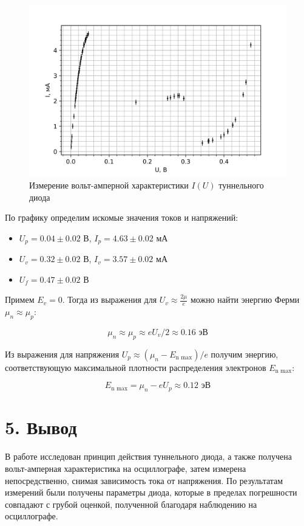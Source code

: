 \documentclass[a4paper,12pt]{report}
\begin{document}
\begin{figure}[H]
    \includegraphics[scale=0.8]{I(U).png}
    \caption{Измерение вольт-амперной характеристики $I(U)$ туннельного диода}
    \label{graf}
\end{figure}

По графику определим искомые значения токов и напряжений:
	
\begin{itemize}
    \centering
    \item $ U_p = 0.04 \pm 0.02 $ В, $ I_p = 4.63 \pm 0.02 $ мА
    \item $ U_v = 0.32 \pm 0.02 $ В, $ I_v = 3.57 \pm 0.02 $ мА
    \item $ U_f = 0.47 \pm 0.02 $ В
\end{itemize} 

Примем $E_v = 0$. Тогда из выражения для $U_v \approx \frac{2\mu}{e}$ можно найти энергию Ферми $\mu_n \approx \mu_p$:

\[ \mu_n \approx \mu_p \approx eU_v/2 \approx 0.16 \text{ эВ} \]

Из выражения для напряжения $U_p \approx (\mu_n - E_\text{n max})/e$ получим энергию, соответствующую максимальной плотности распределения электронов $E_\text{n max}$:

\[ E_\text{n max} = \mu_n - eU_p \approx 0.12 \text{ эВ} \] 

\section*{5. Вывод}

В работе исследован принцип действия туннельного диода, а также получена вольт-амперная характеристика на осциллографе, затем измерена непосредственно, снимая зависимость тока от напряжения. По результатам измерений были получены параметры диода, которые в пределах погрешности совпадают с грубой оценкой, полученной благодаря наблюдению на осциллографе.
\end{document}
